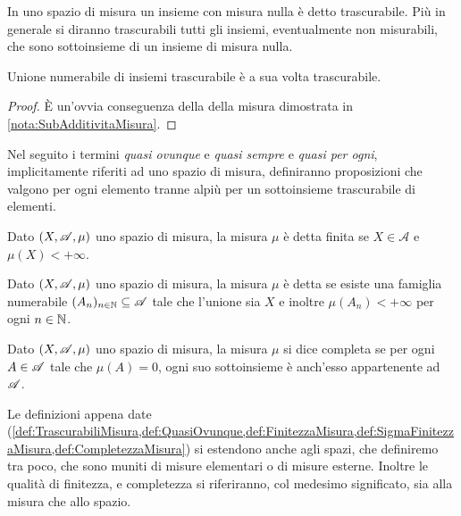 \begin{definition}\label{def:TrascurabiliMisura}
	In uno spazio di misura un insieme con misura nulla è detto trascurabile.
	Più in generale si diranno trascurabili tutti gli insiemi, eventualmente non misurabili, che sono sottoinsieme di un insieme di misura nulla.
\end{definition}
\begin{remark}\label{nota:UnioneTrascurabili}
	Unione numerabile di insiemi trascurabile è a sua volta trascurabile.
\end{remark}
\begin{proof}
	È un'ovvia conseguenza della \sigsubadd[ità] della misura dimostrata in \cref{nota:SubAdditivitaMisura}.
\end{proof}

\begin{definition}\label{def:QuasiOvunque}
	Nel seguito i termini \emph{quasi ovunque} e \emph{quasi sempre} e \emph{quasi per ogni}, implicitamente riferiti ad uno spazio di misura, definiranno proposizioni che valgono per ogni elemento tranne alpiù per un sottoinsieme trascurabile di elementi.
\end{definition}


\begin{definition}\label{def:FinitezzaMisura}
	Dato $(X,\mathscr A,\mu)$ uno spazio di misura, la misura $\mu$ è detta finita se $X\in\mathcal{A}$ e $\mu(X)<+\infty$.
\end{definition}

\begin{definition}\label{def:SigmaFinitezzaMisura}
	Dato $(X,\mathscr A,\mu)$ uno spazio di misura, la misura $\mu$ è detta \sigfin{} se esiste una famiglia numerabile $(A_n)_{n\in\mathbb N}\subseteq \mathscr A$ tale che l'unione sia $X$ e inoltre $\mu(A_n)<+\infty$ per ogni $n\in\mathbb N$.
\end{definition}

\begin{definition}\label{def:CompletezzaMisura}
	Dato $(X,\mathscr A,\mu)$ uno spazio di misura, la misura $\mu$ si dice completa se per ogni $A\in\mathscr A$ tale che $\mu(A)=0$, ogni suo sottoinsieme è anch'esso appartenente ad $\mathscr A$.
\end{definition}

\begin{remark}
	Le definizioni appena date (\cref{def:TrascurabiliMisura,def:QuasiOvunque,def:FinitezzaMisura,def:SigmaFinitezzaMisura,def:CompletezzaMisura}) si estendono anche agli spazi, che definiremo tra poco, che sono muniti di misure elementari o di misure esterne. Inoltre le qualità di finitezza, \sigfin[ezza] e completezza si riferiranno, col medesimo significato, sia alla misura che allo spazio. 
\end{remark}

